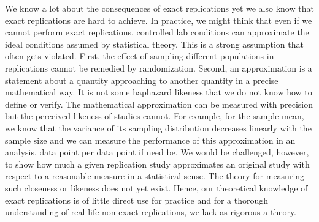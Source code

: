 \documentclass[meta,authordate]{jote-new-article}
\begin{document}
We know a lot about the consequences of exact replications yet we also know that exact replications are hard to achieve. In practice, we might think that even if we cannot perform exact replications, controlled lab conditions can approximate the ideal conditions assumed by statistical theory. This is a strong assumption that often gets violated. First, the effect of sampling different populations in replications cannot be remedied by randomization. Second, an approximation is a statement about a quantity approaching to another quantity in a precise mathematical way. It is not some haphazard likeness that we do not know how to define or verify. The mathematical approximation can be measured with precision but the perceived likeness of studies cannot. For example, for the sample mean, we know that the variance of its sampling distribution decreases linearly with the sample size and we can measure the performance of this approximation in an analysis, data point per data point if need be. We would be challenged, however, to show how much a given replication study approximates an original study with respect to a reasonable measure in a statistical sense. The theory for measuring such closeness or likeness does not yet exist. Hence, our theoretical knowledge of exact replications is of little direct use for practice and for a thorough understanding of real life non-exact replications, we lack as rigorous a theory.




\end{document}
